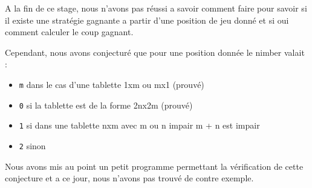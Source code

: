 A la fin de ce stage, nous n'avons pas réussi a savoir comment faire pour savoir si il existe une stratégie gagnante a partir d'une position de jeu donné et si oui comment calculer le coup gagnant.

Cependant, nous avons conjecturé que pour une position donnée le nimber valait :
\begin{itemize}
  \item \texttt{m} dans le cas d'une tablette 1xm ou mx1 (prouvé)
  \item \texttt{0} si la tablette est de la forme 2nx2m (prouvé)
  \item \texttt{1} si dans une tablette nxm avec m ou n impair m + n est impair
  \item \texttt{2} sinon
\end{itemize}
  Nous avons mis au point un petit programme permettant la vérification de cette conjecture et a ce jour, nous n'avons pas trouvé de contre exemple.